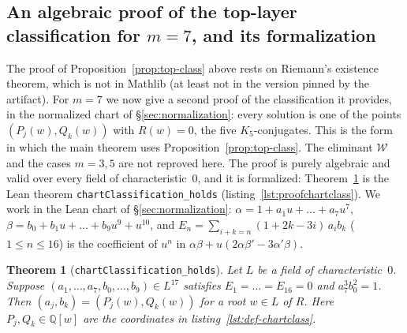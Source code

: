 \documentclass[a4paper,11pt]{article}
\theoremstyle{plain}
\newtheorem{theorem}{Theorem}[section]
\theoremstyle{definition}
\theoremstyle{remark}
\begin{document}
\subsection{An algebraic proof of the top-layer classification for $m=7$, and its formalization}\label{sec:chartproof}

The proof of Proposition~\ref{prop:top-class} above rests on Riemann's existence theorem, which is not in Mathlib (at least not in the version pinned by the artifact). For $m=7$ we now give a second proof of the classification it provides, in the normalized chart of \S\ref{sec:normalization}: every solution is one of the points $(P_j(w),Q_k(w))$ with $R(w)=0$, the five $K_5$-conjugates. This is the form in which the main theorem uses Proposition~\ref{prop:top-class}. The eliminant $\mathcal{W}$ and the cases $m=3,5$ are not reproved here. The proof is purely algebraic and valid over every field of characteristic~$0$, and it is formalized: Theorem~\ref{thm:chartclass} is the Lean theorem \texttt{chartClassification\_holds} (listing~\ref{lst:proofchartclass}). We work in the Lean chart of \S\ref{sec:normalization}: $\alpha=1+a_1u+\dots+a_7u^7$, $\beta=b_0+b_1u+\dots+b_9u^9+u^{10}$, and $E_n=\sum_{i+k=n}(1+2k-3i)\,a_ib_k$ ($1\le n\le 16$) is the coefficient of $u^n$ in $\alpha\beta+u(2\alpha\beta'-3\alpha'\beta)$.

\begin{theorem}[\texttt{chartClassification\_holds}]\label{thm:chartclass}
Let $L$ be a field of characteristic~$0$. Suppose $(a_1,\dots,a_7,b_0,\dots,b_9)\in L^{17}$ satisfies $E_1=\dots=E_{16}=0$ and $a_7^3b_0^2=1$. Then $(a_j,b_k)=(P_j(w),Q_k(w))$ for a root $w\in L$ of $R$. Here $P_j,Q_k\in\mathbb{Q}[w]$ are the coordinates in listing~\ref{lst:def-chartclass}.
\end{theorem}
\end{document}
